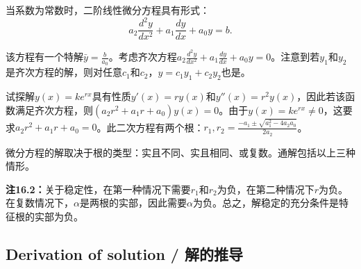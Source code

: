 \begin{translation}
当系数为常数时，二阶线性微分方程具有形式：
\[
a_2\frac{d^2 y}{dx^2} + a_1\frac{dy}{dx} + a_0 y = b.
\]

该方程有一个特解$\bar{y} = \frac{b}{a_0}$。考虑齐次方程$a_2\frac{d^2 y}{dx^2} + a_1\frac{dy}{dx} + a_0 y = 0$。注意到若$y_1$和$y_2$是齐次方程的解，则对任意$c_1$和$c_2$，$y = c_1 y_1 + c_2 y_2$也是。

试探解$y(x) = ke^{rx}$具有性质$y'(x) = r y(x)$和$y''(x) = r^2 y(x)$，因此若该函数满足齐次方程，则$(a_2 r^2 + a_1 r + a_0)y(x) = 0$。由于$y(x) = ke^{rx} \neq 0$，这要求$a_2 r^2 + a_1 r + a_0 = 0$。此二次方程有两个根：$r_1, r_2 = \frac{-a_1 \pm \sqrt{a_1^2 - 4a_2 a_0}}{2a_2}$。

微分方程的解取决于根的类型：实且不同、实且相同、或复数。通解包括以上三种情形。

\textbf{注16.2：}关于稳定性，在第一种情况下需要$r_1$和$r_2$为负，在第二种情况下$r$为负。在复数情况下，$\alpha$是两根的实部，因此需要$\alpha$为负。总之，解稳定的充分条件是特征根的实部为负。
\end{translation}

\subsection{Derivation of solution / 解的推导}

